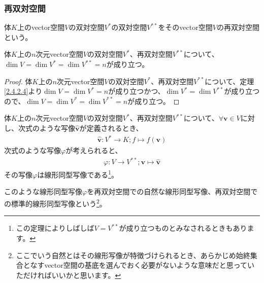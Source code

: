 \documentclass[dvipdfmx]{jsarticle}
\begin{document}
\subsubsection{再双対空間}%
\begin{dfn}
体$K$上のvector空間$V$の双対空間$V^{*}$の双対空間$V^{**}$をそのvector空間$V$の再双対空間という。
\end{dfn}
\begin{thm}\label{2.4.2.8}
体$K$上の$n$次元vector空間$V$の双対空間$V^{*}$、再双対空間$V^{**}$について、$\dim V = \dim V^{*} = \dim V^{**} = n$が成り立つ。
\end{thm}
\begin{proof}
体$K$上の$n$次元vector空間$V$の双対空間$V^{*}$、再双対空間$V^{**}$について、定理\ref{2.4.2.4}より$\dim V = \dim V^{*} = n$が成り立つかつ、$\dim V^{*} = \dim V^{**}$が成り立つので、$\dim V = \dim V^{*} = \dim V^{**} = n$が成り立つ。
\end{proof}
\begin{thm}\label{2.4.2.9}
体$K$上の$n$次元vector空間$V$の双対空間$V^{*}$、再双対空間$V^{**}$について、$\forall\mathbf{v} \in V$に対し、次式のような写像$\widehat{\mathbf{v}}$が定義されるとき、
\begin{align*}
\widehat{\mathbf{v}}:V^{*} \rightarrow K;f \mapsto f\left( \mathbf{v} \right)
\end{align*}
次式のような写像$\varphi$が考えられると、
\begin{align*}
\varphi:V \rightarrow V^{**};\mathbf{v} \mapsto \widehat{\mathbf{v}}
\end{align*}
その写像$\varphi$は線形同型写像である\footnote{この定理によりしばしば$V = V^{**}$が成り立つものとみなされるときもあります。}。
\end{thm}
\begin{dfn}
このような線形同型写像$\varphi$を再双対空間での自然な線形同型写像、再双対空間での標準的線形同型写像という\footnote{ここでいう自然とはその線形写像が特徴づけられるとき、あらかじめ始終集合となすvector空間の基底を選んでおく必要がないような意味だと思っていただければいいかと思います。}。
\end{dfn}
\end{document}
